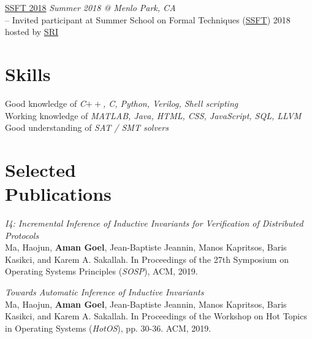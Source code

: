 \documentclass[margin,line,letter]{resume}
\begin{document}
\begin{resume}
    \phantom{xx}\hspace{1ex}
    \href{http://fm.csl.sri.com/SSFT18/}{SSFT 2018} \hfill \emph{Summer 2018 @ Menlo Park, CA} \\
    \phantom{xx}\hspace{1ex} -- Invited participant at Summer School on Formal Techniques (\href{http://fm.csl.sri.com/SSFT18/}{SSFT}) 2018 hosted by \href{http://csl.sri.com/}{SRI}
    
    


\section{\mysidestyle Skills}
    Good knowledge of \emph{C$++$, C, Python, Verilog, Shell scripting} \\
    Working knowledge of \emph{MATLAB, Java, HTML, CSS, JavaScript, SQL, LLVM}  \\
    Good understanding of \emph{SAT / SMT solvers}

\section{\mysidestyle Selected\\Publications}
\textit{I4: Incremental Inference of Inductive Invariants for Verification of Distributed Protocols} \\
Ma, Haojun, \textbf{Aman Goel}, Jean-Baptiste Jeannin, Manos Kapritsos, Baris Kasikci, and Karem A. Sakallah. In Proceedings of the 27th Symposium on Operating Systems Principles (\textit{SOSP}), ACM, 2019.

\textit{Towards Automatic Inference of Inductive Invariants} \\
Ma, Haojun, \textbf{Aman Goel}, Jean-Baptiste Jeannin, Manos Kapritsos, Baris Kasikci, and Karem A. Sakallah. In Proceedings of the Workshop on Hot Topics in Operating Systems (\textit{HotOS}), pp. 30-36. ACM, 2019.


\end{resume}
\end{document}
